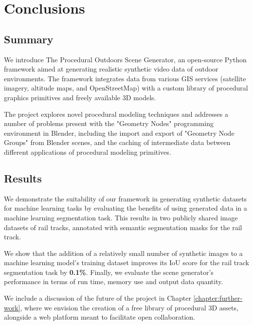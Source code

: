 \chapter{Conclusions}
\label{chapter:Conclusions}

\section{Summary}

We introduce The Procedural Outdoors Scene Generator, an open-source Python framework aimed at generating realistic synthetic video data of outdoor environments. The framework integrates data from various GIS services (satellite imagery, altitude maps, and OpenStreetMap) with a custom library of procedural graphics primitives and freely available 3D models.

The project explores novel procedural modeling techniques and addresses a number of problems present with the "Geometry Nodes" programming environment in Blender, including the import and export of "Geometry Node Groups" from Blender scenes, and the caching of intermediate data between different applications of procedural modeling primitives.

\section{Results}

We demonstrate the suitability of our framework in generating synthetic datasets for machine learning tasks by evaluating the benefits of using generated data in a machine learning segmentation task. This results in two publicly shared image datasets of rail tracks, annotated with semantic segmentation masks for the rail track.

We show that the addition of a relatively small number of synthetic images to a machine learning model's training dataset improves its IoU score for the rail track segmentation task by \textbf{0.1\%}. Finally, we evaluate the scene generator's performance in terms of run time, memory use and output data quantity.

We include a discussion of the future of the project in Chapter \ref{chapter:further-work}, where we envision the creation of a free library of procedural 3D assets, alongside a web platform meant to facilitate open collaboration.